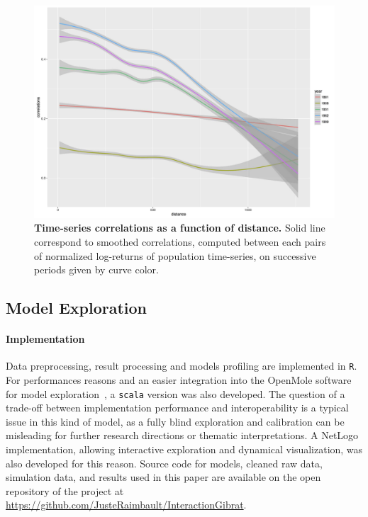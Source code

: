 \documentclass[Royal,sageh,times]{sagej}
\begin{document}
\begin{figure}
\centering
\includegraphics[width=\textwidth]{figures/Fig1.jpg}
\caption{\textbf{Time-series correlations as a function of distance.} Solid line correspond to smoothed correlations, computed between each pairs of normalized log-returns of population time-series, on successive periods given by curve color.}
\label{fig:ts-correlations}
\end{figure}







\subsection*{Model Exploration}


\paragraph{Implementation}


Data preprocessing, result processing and models profiling are implemented in \texttt{R}. For performances reasons and an easier integration into the OpenMole software for model exploration~\citep{reuillon2013openmole}, a \texttt{scala} version was also developed. The question of a trade-off between implementation performance and interoperability is a typical issue in this kind of model, as a fully blind exploration and calibration can be misleading for further research directions or thematic interpretations. A NetLogo implementation, allowing interactive exploration and dynamical visualization, was also developed for this reason. Source code for models, cleaned raw data, simulation data, and results used in this paper are available on the open repository of the project at \url{https://github.com/JusteRaimbault/InteractionGibrat}.
\end{document}

